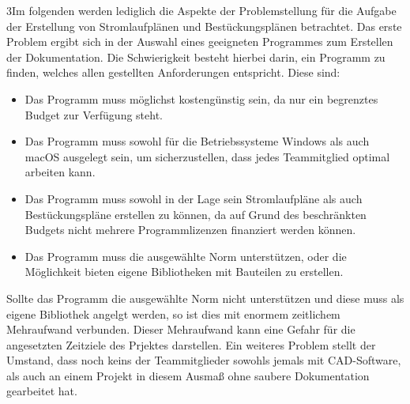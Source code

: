  3Im folgenden werden lediglich die Aspekte der Problemstellung für die Aufgabe der Erstellung von Stromlaufplänen und Bestückungsplänen betrachtet. Das erste Problem ergibt sich in der Auswahl eines geeigneten Programmes zum Erstellen der Dokumentation. Die Schwierigkeit besteht hierbei darin, ein Programm zu finden, welches allen gestellten Anforderungen entspricht. Diese sind: 
\begin{itemize}
	\item Das Programm muss möglichst kostengünstig sein, da nur ein begrenztes Budget zur Verfügung steht.
	\item Das Programm muss sowohl für die Betriebssysteme Windows als auch macOS ausgelegt sein, um sicherzustellen, dass jedes Teammitglied optimal arbeiten kann.
	\item Das Programm muss sowohl in der Lage sein Stromlaufpläne als auch Bestückungspläne erstellen zu können, da auf Grund des beschränkten Budgets nicht mehrere Programmlizenzen finanziert werden können.
	\item Das Programm muss die ausgewählte Norm unterstützen, oder die Möglichkeit bieten eigene Bibliotheken mit Bauteilen zu erstellen.
\end{itemize}   
Sollte das Programm die ausgewählte Norm nicht unterstützen und diese muss als eigene Bibliothek angelgt werden, so ist dies mit enormem zeitlichem Mehraufwand verbunden. Dieser Mehraufwand kann eine Gefahr für die angesetzten Zeitziele des Prjektes darstellen. 
Ein weiteres Problem stellt der Umstand, dass noch keins der Teammitglieder sowohls jemals mit CAD-Software, als auch an einem Projekt in diesem Ausmaß  ohne saubere Dokumentation gearbeitet hat.

